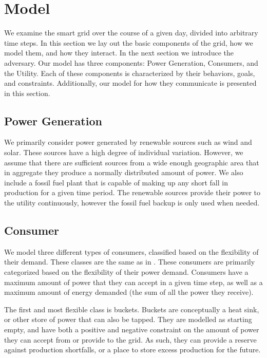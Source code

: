 \documentclass[conference]{IEEEtran}
\begin{document}
\section{Model}
\label{Model}

We examine the smart grid over the course of a given day, divided into arbitrary time steps. In this section we lay out the basic components of the grid, how we model them, and how they interact. In the next section we introduce the adversary. Our model has three components: Power Generation, Consumers, and the Utility. Each of these components is characterized by their behaviors, goals, and constraints. Additionally, our model for how they communicate is presented in this section. 

\subsection{Power Generation}
\label{Power Generation}

We primarily consider power generated by renewable sources such as wind and solar. These sources have a high degree of individual variation. However, we assume that there are sufficient sources from a wide enough geographic area that in aggregate they produce a normally distributed amount of power. We also include a fossil fuel plant that is capable of making up any short fall in production for a given time period. The renewable sources provide their power to the utility continuously, however the fossil fuel backup is only used when needed.

\subsection{Consumer}
\label{Consumer}

We model three different types of consumers, classified based on the flexibility of their demand. These classes are the same as in \cite{petersen2013taxonomy}. These consumers are primarily categorized based on the flexibility of their power demand. Consumers have a maximum amount of power that they can accept in a given time step, as well as a maximum amount of energy demanded (the sum of all the power they receive).

The first and most flexible class is buckets. Buckets are conceptually a heat sink, or other store of power that can also be tapped. They are modelled as starting empty, and have both a positive and negative constraint on the amount of power they can accept from or provide to the grid. As such, they can provide a reserve against production shortfalls, or a place to store excess production for the future.
\end{document}
